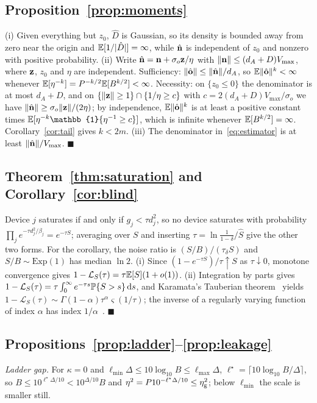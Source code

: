 \subsection{Proposition~\ref{prop:moments}}
(i) Given everything but $z_0$, $\hat D$ is Gaussian, so its density is bounded away from zero near the origin and $\mathbb{E}[1/|\hat D|]=\infty$, while $\hat{\mathbf{n}}$ is independent of $z_0$ and nonzero with positive probability.
(ii) Write $\hat{\mathbf{n}}=\mathbf{n}+\sigma_o\mathbf{z}/\eta$ with $\|\mathbf{n}\|\le(d_A+D)V_{\max}$, where $\mathbf{z}$, $z_0$ and $\eta$ are independent. Sufficiency: $\|\hat{\mathbf{o}}\|\le\|\hat{\mathbf{n}}\|/d_A$, so $\mathbb{E}\|\hat{\mathbf{o}}\|^k<\infty$ whenever $\mathbb{E}[\eta^{-k}]=P^{-k/2}\mathbb{E}[B^{k/2}]<\infty$. Necessity: on $\{z_0\le0\}$ the denominator is at most $d_A+D$, and on $\{\|\mathbf{z}\|\ge1\}\cap\{1/\eta\ge c\}$ with $c=2(d_A+D)V_{\max}/\sigma_o$ we have $\|\hat{\mathbf{n}}\|\ge\sigma_o\|\mathbf{z}\|/(2\eta)$; by independence, $\mathbb{E}\|\hat{\mathbf{o}}\|^k$ is at least a positive constant times $\E[\eta^{-k}\mathbb{1}\{\eta^{-1}\ge c\}]$, which is infinite whenever $\mathbb{E}[B^{k/2}]=\infty$. Corollary~\ref{cor:tail} gives $k<2m$.
(iii) The denominator in~\eqref{eq:estimator} is at least $\|\hat{\mathbf{n}}\|/V_{\max}$. \hfill$\blacksquare$

\subsection{Theorem~\ref{thm:saturation} and Corollary~\ref{cor:blind}}
Device $j$ saturates if and only if $g_j<\tau d_j^2$, so no device saturates with probability $\prod_je^{-\tau d_j^2/\beta_j}=e^{-\tau S}$; averaging over $S$ and inserting $\tau=\ln\frac{1}{1-\delta}/\hat S$ give the other two forms. For the corollary, the noise ratio is $(S/B)/(\tau_\delta S)$ and $S/B\sim\mathrm{Exp}(1)$ has median $\ln2$. (i) Since $(1-e^{-\tau S})/\tau\uparrow S$ as $\tau\downarrow0$, monotone convergence gives $1-\mathcal{L}_S(\tau)=\tau\mathbb{E}[S](1+o(1))$. (ii) Integration by parts gives $1-\mathcal{L}_S(\tau)=\tau\int_0^\infty e^{-\tau s}\mathbb{P}\{S>s\}\,\mathrm{d}s$, and Karamata's Tauberian theorem~\cite[Thm.~1.7.1]{bingham1987regular} yields $1-\mathcal{L}_S(\tau)\sim\Gamma(1-\alpha)\tau^\alpha\varsigma(1/\tau)$; the inverse of a regularly varying function of index $\alpha$ has index $1/\alpha$~\cite[Thm.~1.5.12]{bingham1987regular}. \hfill$\blacksquare$

\subsection{Propositions~\ref{prop:ladder}--\ref{prop:leakage}}
\emph{Ladder gap.} For $\kappa=0$ and $\ell_{\min}\Delta\le10\log_{10}B\le\ell_{\max}\Delta$, $\ell^\star=\lceil10\log_{10}B/\Delta\rceil$, so $B\le10^{\ell^\star\Delta/10}<10^{\Delta/10}B$ and $\eta^2=P10^{-\ell^\star\Delta/10}\le\eta_{\rm g}^2$; below $\ell_{\min}$ the scale is smaller still.

